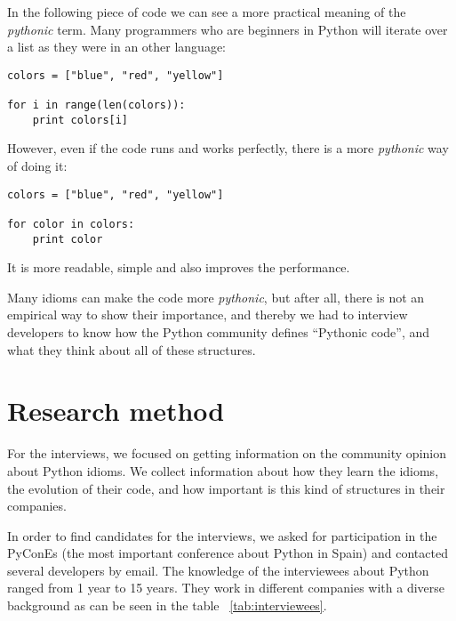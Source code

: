\documentclass[a4paper]{article}
\begin{document}
In the following piece of code we can see a more practical meaning of the \textit{pythonic} term. Many programmers who are beginners in Python will iterate over a list as they were in an other language:

\begin{verbatim}
colors = ["blue", "red", "yellow"]

for i in range(len(colors)):
    print colors[i]
\end{verbatim}

However, even if the code runs and works perfectly, there is a more \emph{pythonic} way of
doing it:

\begin{verbatim}
colors = ["blue", "red", "yellow"]

for color in colors:
    print color
\end{verbatim}

It is more readable, simple and also improves the performance.

Many idioms can make the code more \textit{pythonic}, but after all, there is not an empirical way to show their importance, and thereby we had to interview developers to know how the Python community defines ``Pythonic code'', and what they think about all of these structures.


\section{Research method}

For the interviews, we focused on getting information on the community opinion about Python idioms. We collect information about how they learn the idioms, the evolution of their code, and how important is this kind of structures in their companies.

In order to find candidates for the interviews, we asked for participation in the PyConEs (the most important conference about Python in Spain) and contacted several developers by email. The knowledge of the interviewees about Python ranged from 1 year to 15 years. They work in different companies with a diverse background as can be seen in the table ~\ref{tab:interviewees}.
\end{document}
